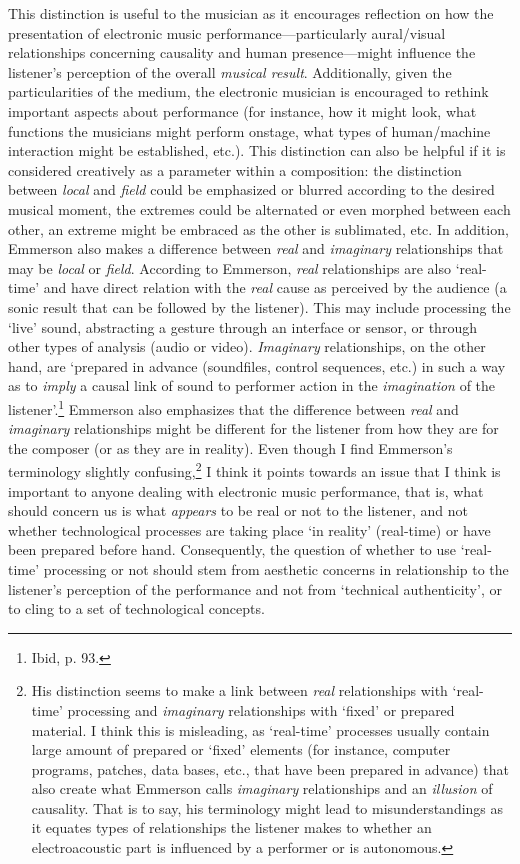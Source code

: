 This distinction is useful to the musician as it encourages reflection on how the presentation of electronic music performance---particularly aural/visual relationships concerning causality and human presence---might influence the listener's perception of the overall \emph{musical result}. Additionally, given the particularities of the medium, the electronic musician is encouraged to rethink important aspects about performance (for instance, how it might look, what functions the musicians might perform onstage, what types of human/machine interaction might be established, etc.). This distinction can also be helpful if it is considered creatively as a parameter within a composition: the distinction between \emph{local} and \emph{field} could be emphasized or blurred according to the desired musical moment, the extremes could be alternated or even morphed between each other, an extreme might be embraced as the other is sublimated, etc. In addition, Emmerson also makes a difference between \emph{real} and \emph{imaginary} relationships that may be \emph{local} or \emph{field}. According to Emmerson, \emph{real} relationships are also `real-time' and have direct relation with the \emph{real} cause as perceived by the audience (a sonic result that can be followed by the listener). This may include processing the `live' sound, abstracting a gesture through an interface or sensor, or through other types of analysis (audio or video). \emph{Imaginary} relationships, on the other hand, are `prepared in advance (soundfiles, control sequences,  etc.) in such a way as to \emph{imply} a causal link of sound to performer action in the \emph{imagination} of the listener'.\footnote{Ibid, p. 93.} Emmerson also emphasizes that the difference between \emph{real} and \emph{imaginary} relationships might be different for the listener from how they are for the composer (or as they are in reality). Even though I find Emmerson's terminology slightly confusing,\footnote{His distinction seems to make a link between \emph{real} relationships with `real-time' processing and \emph{imaginary} relationships with `fixed' or prepared material. I think this is misleading, as `real-time' processes usually contain large amount of prepared or `fixed' elements (for instance, computer programs, patches, data bases,  etc., that have been prepared in advance) that also create what Emmerson calls \emph{imaginary} relationships and an \emph{illusion} of causality. That is to say, his terminology might lead to misunderstandings as it equates types of relationships the listener makes to whether an electroacoustic part is influenced by a performer or is autonomous.} I think it points towards an issue that I think is important to anyone dealing with electronic music performance, that is, what should concern us is what \emph{appears} to be real or not to the listener, and not whether technological processes are taking place `in reality' (real-time) or have been prepared before hand. Consequently, the question of whether to use `real-time' processing or not should stem from aesthetic concerns in relationship to the listener's perception of the performance and not from `technical authenticity', or to cling to a set of technological concepts.
\hypertarget{newrelationships}{}

